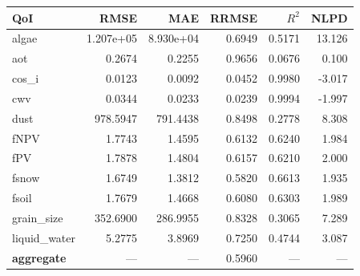 \begin{tabular}{lrrrrr}
\toprule
QoI & RMSE & MAE & RRMSE & $R^2$ & NLPD \\
\midrule
algae & 1.207e+05 & 8.930e+04 & 0.6949 & 0.5171 & 13.126 \\
aot & 0.2674 & 0.2255 & 0.9656 & 0.0676 & 0.100 \\
cos\_i & 0.0123 & 0.0092 & 0.0452 & 0.9980 & -3.017 \\
cwv & 0.0344 & 0.0233 & 0.0239 & 0.9994 & -1.997 \\
dust & 978.5947 & 791.4438 & 0.8498 & 0.2778 & 8.308 \\
fNPV & 1.7743 & 1.4595 & 0.6132 & 0.6240 & 1.984 \\
fPV & 1.7878 & 1.4804 & 0.6157 & 0.6210 & 2.000 \\
fsnow & 1.6749 & 1.3812 & 0.5820 & 0.6613 & 1.935 \\
fsoil & 1.7679 & 1.4668 & 0.6080 & 0.6303 & 1.989 \\
grain\_size & 352.6900 & 286.9955 & 0.8328 & 0.3065 & 7.289 \\
liquid\_water & 5.2775 & 3.8969 & 0.7250 & 0.4744 & 3.087 \\
\midrule
\textbf{aggregate} & --- & --- & 0.5960 & --- & --- \\
\bottomrule
\end{tabular}
